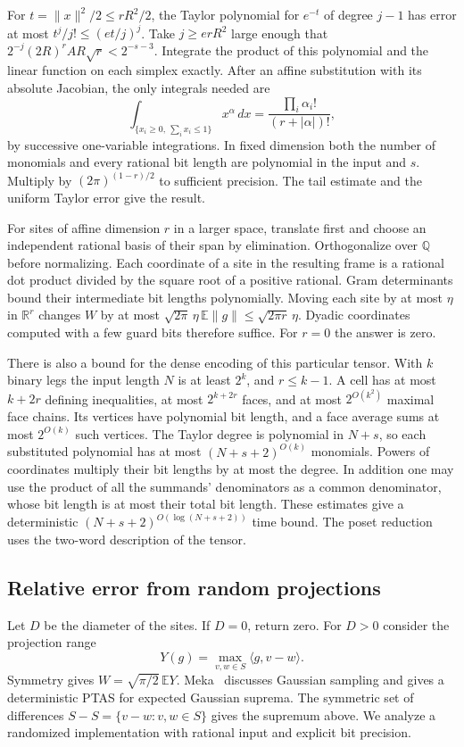 \documentclass[11pt,letterpaper]{article}
\theoremstyle{definition}
\newcommand{\E}{\mathbb E}
\newcommand{\R}{\mathbb R}
\newcommand{\Q}{\mathbb Q}
\newcommand{\norm}[1]{\lVert#1\rVert}
\newcommand{\ip}[2]{\langle #1,#2\rangle}
\begin{document}
For \(t=\norm{x}^2/2\le rR^2/2\), the Taylor polynomial for \(e^{-t}\)
of degree \(j-1\) has error at most \(t^j/j!\le(et/j)^j\). Take
\(j\ge erR^2\) large enough that \(2^{-j}(2R)^rAR\sqrt r<2^{-s-3}\).
Integrate the product of this polynomial and the linear function on each
simplex exactly. After an affine substitution with its absolute Jacobian,
the only integrals needed are
\[
 \int_{\{x_i\ge0,\ \sum_i x_i\le1\}} x^\alpha\,dx
   =\frac{\prod_i\alpha_i!}{(r+|\alpha|)!},
\]
by successive one-variable integrations. In fixed dimension both the number
of monomials and every rational bit length are polynomial in the input and
\(s\). Multiply by \((2\pi)^{(1-r)/2}\) to sufficient precision. The
tail estimate and the uniform Taylor error give the result.

For sites of affine dimension \(r\) in a larger space, translate first and
choose an independent rational basis of their span by elimination.
Orthogonalize over \(\Q\) before normalizing. Each coordinate of a site in
the resulting frame is a rational dot product divided by the square root
of a positive rational. Gram determinants bound their intermediate bit
lengths polynomially. Moving each site by at most \(\eta\) in \(\R^r\)
changes \(W\) by at most \(\sqrt{2\pi}\,\eta\,\E\norm g
\le\sqrt{2\pi r}\,\eta\). Dyadic coordinates computed with a few guard
bits therefore suffice. For \(r=0\) the answer is zero.

There is also a bound for the dense encoding of this particular tensor.
With \(k\) binary legs the input length \(N\) is at least \(2^k\), and
\(r\le k-1\). A cell has at most \(k+2r\) defining inequalities, at most
\(2^{k+2r}\) faces, and at most \(2^{O(k^2)}\) maximal face chains.
Its vertices have polynomial bit length, and a face average sums at most
\(2^{O(k)}\) such vertices. The Taylor degree is polynomial in \(N+s\),
so each substituted polynomial has at most \((N+s+2)^{O(k)}\) monomials.
Powers of coordinates multiply their bit lengths by at most the degree.
In addition one may use the product of all the summands' denominators as
a common denominator, whose bit length is at most their total bit length.
These estimates give a deterministic \((N+s+2)^{O(\log(N+s+2))}\) time
bound. The poset reduction uses the two-word description of the tensor.

\subsection{Relative error from random projections}
Let \(D\) be the diameter of the sites. If \(D=0\), return zero. For
\(D>0\) consider the projection range
\[
 Y(g)=\max_{v,w\in S}\ip{g}{v-w}.
\]
Symmetry gives \(W=\sqrt{\pi/2}\,\E Y\).
Meka~\cite[Introduction and Theorem~1.2]{meka-gaussian} discusses Gaussian sampling and gives a deterministic PTAS for expected Gaussian suprema. The symmetric set of differences \(S-S=\{v-w:v,w\in S\}\) gives the supremum above. We analyze a randomized implementation with rational input and explicit bit precision.
\end{document}
